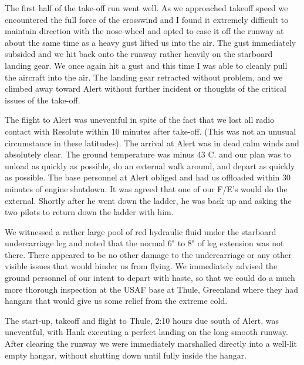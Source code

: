 The first half of the take-off run went well. As we approached takeoff
speed we encountered the full force of the crosswind and I found it
extremely difficult to maintain direction with the nose-wheel and opted
to ease it off the runway at about the same time as a heavy gust lifted
us into the air. The gust immediately subsided and we hit back onto the
runway rather heavily on the starboard landing gear. We once again hit
a gust and this time I was able to cleanly pull the aircraft into the
air. The landing gear retracted without problem, and we climbed away
toward Alert without further incident or thoughts of the critical
issues of the take-off.

The flight to Alert was uneventful in spite of the fact that we lost
all radio contact with Resolute within 10 minutes after take-off. (This
was not an unusual circumstance in these latitudes). The arrival at
Alert was in dead calm winds and absolutely clear. The ground
temperature was minus 43 C. and our plan was to unload as quickly as
possible, do an external walk around, and depart as quickly as
possible. The base personnel at Alert obliged and had us offloaded
within 30 minutes of engine shutdown. It was agreed that one of our
F/E's would do the external. Shortly after he went down the ladder, he
was back up and asking the two pilots to return down the ladder with
him.

We witnessed a rather large pool of red hydraulic fluid under the
starboard undercarriage leg and noted that the normal 6" to 8" of leg
extension was not there. There appeared to be no other damage to the
undercarriage or any other visible issues that would hinder us from
flying. We immediately advised the ground personnel of our intent to
depart with haste, so that we could do a much more thorough inspection
at the USAF base at Thule, Greenland where they had hangars that would
give us some relief from the extreme cold.

The start-up, takeoff and flight to Thule, 2:10 hours due south of
Alert, was uneventful, with Hank executing a perfect landing on the
long smooth runway. After clearing the runway we were immediately
marshalled directly into a well-lit empty hangar, without shutting down
until fully inside the hangar.

